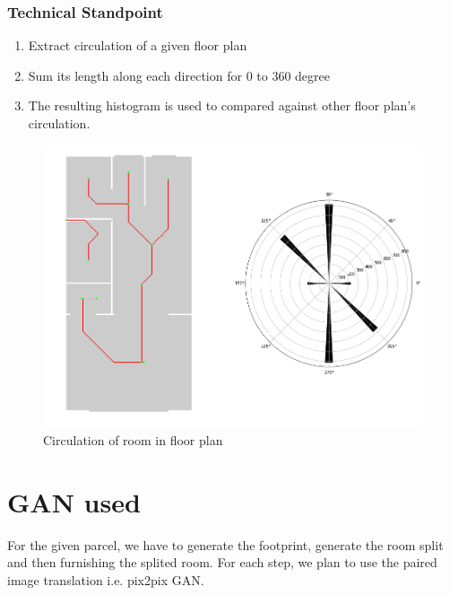                         \subsubsection{Technical Standpoint}
                                \begin{enumerate}[label=\alph*.]
                                        \item Extract circulation of a given floor plan
                                        \item Sum its length along each direction for 0 to 360 degree
                                        \item The resulting histogram is used to compared against other floor plan's circulation.
                                \end{enumerate}
                       
                        \begin{figure}[h]
                                \centering
                                \includegraphics[width=.8\textwidth]{img/chapter_6/circulation.png}
                                \caption{Circulation of room in floor plan}
                                \label{fig:Circulation of room in floor plan}
                        \end{figure}
                \pagebreak
        \section{GAN used }
                For the given parcel, we have to generate the footprint, generate the room split and then furnishing the splited room. For each step, we plan to use the paired image translation i.e. pix2pix GAN.
